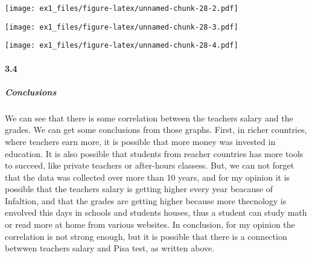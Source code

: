 \documentclass[]{article}
\newenvironment{Shaded}{\begin{snugshade}}{\end{snugshade}}
\newcommand{\KeywordTok}[1]{\textcolor[rgb]{0.13,0.29,0.53}{\textbf{#1}}}
\newcommand{\DataTypeTok}[1]{\textcolor[rgb]{0.13,0.29,0.53}{#1}}
\newcommand{\DecValTok}[1]{\textcolor[rgb]{0.00,0.00,0.81}{#1}}
\newcommand{\StringTok}[1]{\textcolor[rgb]{0.31,0.60,0.02}{#1}}
\newcommand{\CommentTok}[1]{\textcolor[rgb]{0.56,0.35,0.01}{\textit{#1}}}
\newcommand{\OtherTok}[1]{\textcolor[rgb]{0.56,0.35,0.01}{#1}}
\newcommand{\OperatorTok}[1]{\textcolor[rgb]{0.81,0.36,0.00}{\textbf{#1}}}
\newcommand{\NormalTok}[1]{#1}
\let\oldparagraph\paragraph
\renewcommand{\paragraph}[1]{\oldparagraph{#1}\mbox{}}
\let\oldsubparagraph\subparagraph
\renewcommand{\subparagraph}[1]{\oldsubparagraph{#1}\mbox{}}
\begin{document}
\texttt{[image: ex1\_files/figure-latex/unnamed-chunk-28-2.pdf]}

\begin{Shaded}
\end{Shaded}

\texttt{[image: ex1\_files/figure-latex/unnamed-chunk-28-3.pdf]}

\begin{Shaded}
\end{Shaded}

\texttt{[image: ex1\_files/figure-latex/unnamed-chunk-28-4.pdf]}

\paragraph{3.4}\label{section-12}

\subparagraph{Conclusions}\label{conclusions}

We can see that there is some correlation between the teachers salary
and the grades. We can get some conclusions from those graphs. First, in
richer countries, where teachers earn more, it is possible that more
money was invested in education. It is also possible that students from
reacher countries has more tools to succeed, like private teachers or
after-hours classess. But, we can not forget that the data was collected
over more than 10 years, and for my opinion it is possible that the
teachers salary is getting higher every year beacause of Infaltion, and
that the grades are getting higher because more thecnology is envolved
this days in schools and students houses, thus a student can study math
or read more at home from various websites. In conclusion, for my
opinion the correlation is not strong enough, but it is possible that
there is a connection betwwen teachers salary and Pisa test, as written
above.
\end{document}
